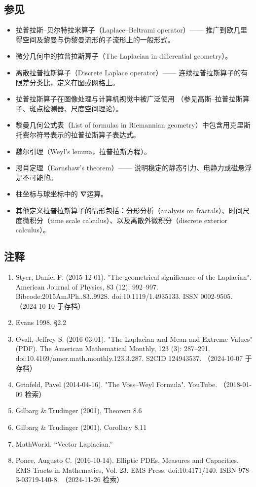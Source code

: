 \subsection{参见}
\begin{itemize}
  \item 拉普拉斯–贝尔特拉米算子（Laplace–Beltrami operator）——
        推广到欧几里得空间及黎曼与伪黎曼流形的子流形上的一般形式。
  \item 微分几何中的拉普拉斯算子（The Laplacian in differential geometry）。
  \item 离散拉普拉斯算子（Discrete Laplace operator）——
        连续拉普拉斯算子的有限差分类比，定义在图或网格上。
  \item 拉普拉斯算子在图像处理与计算机视觉中被广泛使用
        （参见高斯–拉普拉斯算子、斑点检测器、尺度空间理论）。
  \item 黎曼几何公式表（List of formulas in Riemannian geometry）中包含用克里斯托费尔符号表示的拉普拉斯算子表达式。
  \item 魏尔引理（Weyl’s lemma，拉普拉斯方程）。
  \item 恩肖定理（Earnshaw’s theorem）——
        说明稳定的静态引力、电静力或磁悬浮是不可能的。
  \item 柱坐标与球坐标中的 $\boldsymbol{\nabla}$运算。
  \item 其他定义拉普拉斯算子的情形包括：分形分析（analysis on fractals）、时间尺度微积分（time scale calculus）、以及离散外微积分（discrete exterior calculus）。
\end{itemize}
\subsection{注释}
\begin{enumerate}
  \item Styer, Daniel F. (2015-12-01). "The geometrical significance of the Laplacian". American Journal of Physics, 83 (12): 992–997. Bibcode:2015AmJPh..83..992S. doi:10.1119/1.4935133. ISSN 0002-9505. （2024-10-10 于存档）
  \item Evans 1998, §2.2
  \item Ovall, Jeffrey S. (2016-03-01). "The Laplacian and Mean and Extreme Values" (PDF). The American Mathematical Monthly, 123 (3): 287–291. doi:10.4169/amer.math.monthly.123.3.287. S2CID 124943537. （2024-10-07 于存档）
  \item Grinfeld, Pavel (2014-04-16). "The Voss–Weyl Formula". YouTube. （2018-01-09 检索）
  \item Gilbarg \& Trudinger (2001), Theorem 8.6
  \item Gilbarg \& Trudinger (2001), Corollary 8.11
  \item MathWorld. “Vector Laplacian.”
  \item Ponce, Augusto C. (2016-10-14). Elliptic PDEs, Measures and Capacities. EMS Tracts in Mathematics, Vol. 23. EMS Press. doi:10.4171/140. ISBN 978-3-03719-140-8. （2024-11-26 检索）
\end{enumerate}
